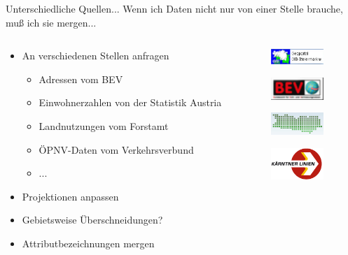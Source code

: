 \documentclass{beamer}
\begin{document}
\begin{frame}{Unterschiedliche Quellen...}
	Wenn ich Daten nicht nur von einer Stelle brauche, muß ich sie mergen...
	\begin{columns}[c]
		                \begin{column}[T]{.7\textwidth}
	\begin{itemize}
		\item An verschiedenen Stellen anfragen
			\begin{itemize}
				\item Adressen vom BEV 
				\item Einwohnerzahlen von der Statistik Austria
				\item Landnutzungen vom Forstamt
				\item ÖPNV-Daten vom Verkehrsverbund
				\item ...
			\end{itemize}
			\pause
		\item Projektionen anpassen
		\item Gebietsweise Überschneidungen?
		\item Attributbezeichnungen mergen
	\end{itemize}
\end{column}
\begin{column}[T]{.3\textwidth}

	\includegraphics[width=2cm]{gis-stmkl.png} 
	\vspace{4mm}

	\includegraphics[width=2cm]{bev.png} 
	\vspace{4mm}

	\includegraphics[width=2cm]{gis-ktn.png} 
	\vspace{4mm}

	\includegraphics[width=2cm]{ktn-linien.png} 

\end{column}
\end{columns}

\end{frame}
\end{document}
